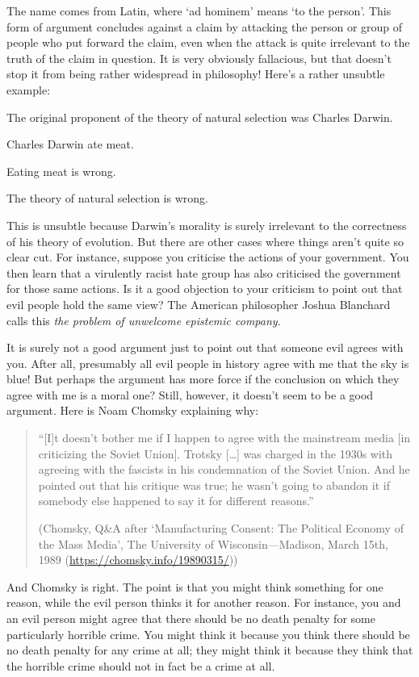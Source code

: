 The name comes from Latin, where `ad hominem' means `to the person'. This form of argument concludes against a claim by attacking the person or group of people who put forward the claim, even when the attack is quite irrelevant to the truth of the claim in question. It is very obviously fallacious, but that doesn't stop it from being rather widespread in philosophy! Here's a rather unsubtle example:
\begin{earg}
\prem The original proponent of the theory of natural selection was Charles Darwin.

\prem Charles Darwin ate meat.

\prem Eating meat is wrong.

\conc The theory of natural selection is wrong.
\end{earg}
This is unsubtle because Darwin's morality is surely irrelevant to the correctness of his theory of evolution. But there are other cases where things aren't quite so clear cut. For instance, suppose you criticise the actions of your government. You then learn that a virulently racist hate group has also criticised the government for those same actions. Is it a good objection to your criticism to point out that evil people hold the same view? The American philosopher Joshua Blanchard calls this \emph{the problem of unwelcome epistemic company}.

It is surely not a good argument just to point out that someone evil agrees with you. After all, presumably all evil people in history agree with me that the sky is blue! But perhaps the argument has more force if the conclusion on which they agree with me is a moral one? Still, however, it doesn't seem to be a good argument. Here is Noam Chomsky explaining why:
\begin{quote}
``[I]t doesn’t bother me if I happen to agree with the mainstream media [in criticizing the  Soviet  Union]. Trotsky [\ldots] was charged in the 1930s with agreeing with the fascists in his condemnation of the Soviet Union. And he pointed out that his critique was true; he wasn't going to abandon it if somebody else happened to say it for different reasons.'' 

(Chomsky, Q\&A after `Manufacturing Consent: The Political Economy of the Mass Media', The University of Wisconsin---Madison, March 15th, 1989 (\url{https://chomsky.info/19890315/}))
\end{quote}
And Chomsky is right. The point is that you might think something for one reason, while the evil person thinks it for another reason. For instance, you and an evil person might agree that there should be no death penalty for some particularly horrible crime. You might think it because you think there should be no death penalty for any crime at all; they might think it because they think that the horrible crime should not in fact be a crime at all. 

